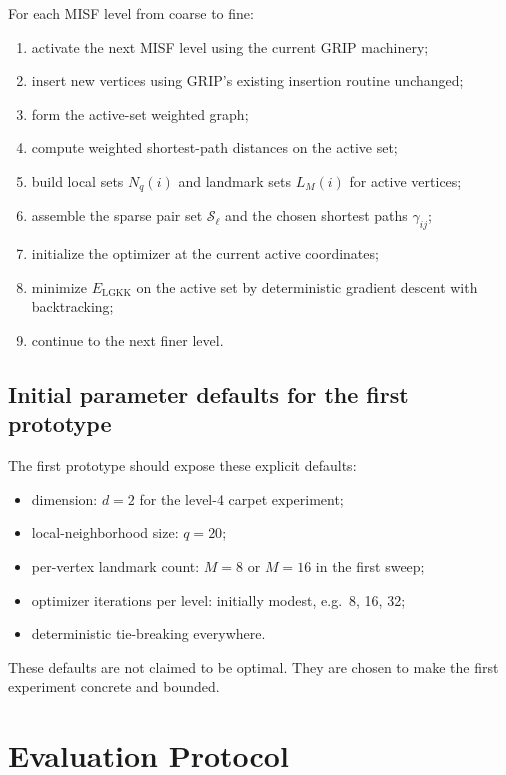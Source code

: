 \documentclass[11pt]{article}
\begin{document}
For each MISF level from coarse to fine:
\begin{enumerate}[leftmargin=1.8em]
  \item activate the next MISF level using the current GRIP machinery;
  \item insert new vertices using GRIP's existing insertion routine unchanged;
  \item form the active-set weighted graph;
  \item compute weighted shortest-path distances on the active set;
  \item build local sets $N_q(i)$ and landmark sets $L_M(i)$ for active
    vertices;
  \item assemble the sparse pair set $\mathcal{S}_\ell$ and the chosen shortest
    paths $\gamma_{ij}$;
  \item initialize the optimizer at the current active coordinates;
  \item minimize $E_{\mathrm{LGKK}}$ on the active set by deterministic
    gradient descent with backtracking;
  \item continue to the next finer level.
\end{enumerate}

\subsection{Initial parameter defaults for the first prototype}

The first prototype should expose these explicit defaults:
\begin{itemize}[leftmargin=1.4em]
  \item dimension: $d=2$ for the level-4 carpet experiment;
  \item local-neighborhood size: $q = 20$;
  \item per-vertex landmark count: $M = 8$ or $M = 16$ in the first sweep;
  \item optimizer iterations per level: initially modest, e.g.\ 8, 16, 32;
  \item deterministic tie-breaking everywhere.
\end{itemize}

These defaults are not claimed to be optimal. They are chosen to make the first
experiment concrete and bounded.

\section{Evaluation Protocol}
\end{document}
